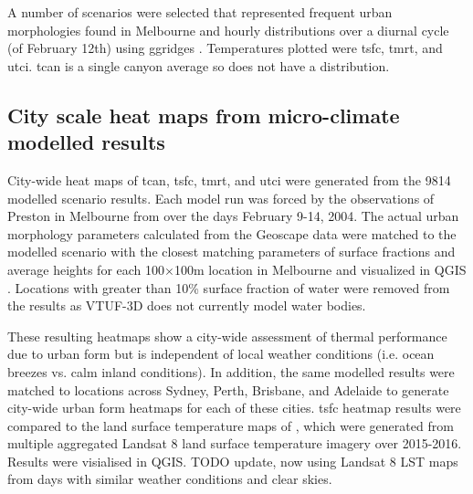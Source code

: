 \documentclass[final,3p,times,authoryear]{elsarticle}
\begin{document}
A number of scenarios were selected that represented frequent urban morphologies found in Melbourne and hourly distributions over a diurnal cycle (of February 12th) using ggridges \citep{ggridges}. Temperatures plotted were \gls{tsfc}, \gls{tmrt}, and \gls{utci}. \gls{tcan} is a single canyon average so does not have a distribution.


\subsection{City scale heat maps from micro-climate modelled results}\label{sec:methodsheatmaps}
%
%  

City-wide heat maps of \gls{tcan}, \gls{tsfc}, \gls{tmrt}, and \gls{utci} were generated from the 9814 modelled scenario results. Each model run was forced by the observations of Preston in Melbourne from \cite{Coutts2007} over the days February 9-14, 2004. The actual urban morphology parameters calculated from the Geoscape data were matched to the modelled scenario with the closest matching parameters of surface fractions and average heights for each 100$\times$100m location in Melbourne and visualized in QGIS \citep{QGIS2009}. Locations with greater than 10\% surface fraction of water were removed from the results as VTUF-3D does not currently model water bodies.

These resulting heatmaps show a city-wide assessment of thermal performance due to urban form but is independent of local weather conditions (i.e. ocean breezes vs. calm inland conditions). In addition, the same modelled results were matched to locations across Sydney, Perth, Brisbane, and Adelaide to generate city-wide urban form heatmaps for each of these cities.  \gls{tsfc} heatmap results were compared to the land surface temperature maps of \cite{Devereux2017}, which were generated from multiple aggregated Landsat 8 land surface temperature imagery over 2015-2016. Results were visialised in QGIS. TODO update, now using Landsat 8 LST maps from days with similar weather conditions and clear skies.
\end{document}
